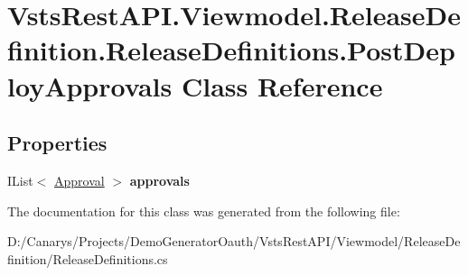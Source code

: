 \hypertarget{class_vsts_rest_a_p_i_1_1_viewmodel_1_1_release_definition_1_1_release_definitions_1_1_post_deploy_approvals}{}\section{Vsts\+Rest\+A\+P\+I.\+Viewmodel.\+Release\+Definition.\+Release\+Definitions.\+Post\+Deploy\+Approvals Class Reference}
\label{class_vsts_rest_a_p_i_1_1_viewmodel_1_1_release_definition_1_1_release_definitions_1_1_post_deploy_approvals}
\subsection*{Properties}
\begin{DoxyCompactItemize}
\item 
\mbox{\label{class_vsts_rest_a_p_i_1_1_viewmodel_1_1_release_definition_1_1_release_definitions_1_1_post_deploy_approvals_a7ec2db184858d4fd95d3e967c5d10f68}} 
I\+List$<$ \mbox{\hyperlink{class_vsts_rest_a_p_i_1_1_viewmodel_1_1_release_definition_1_1_release_definitions_1_1_approval}{Approval}} $>$ {\bfseries approvals}
\end{DoxyCompactItemize}


The documentation for this class was generated from the following file\+:\begin{DoxyCompactItemize}
\item 
D\+:/\+Canarys/\+Projects/\+Demo\+Generator\+Oauth/\+Vsts\+Rest\+A\+P\+I/\+Viewmodel/\+Release\+Definition/Release\+Definitions.\+cs\end{DoxyCompactItemize}
